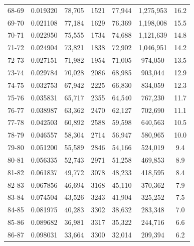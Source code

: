 \documentclass[10pt,a4paper]{article}
\begin{document}
\begin{longtable}{|c|c|c|c|c|c|c|}
68-69  & 0.019320      & 78,705       & 1521          & 77,944        & 1,275,953    & 16.2         \\
69-70  & 0.021108      & 77,184       & 1629          & 76,369        & 1,198,008    & 15.5         \\
70-71  & 0.022950      & 75,555       & 1734          & 74,688        & 1,121,639    & 14.8         \\
71-72  & 0.024904      & 73,821       & 1838          & 72,902        & 1,046,951    & 14.2         \\
72-73  & 0.027151      & 71,982       & 1954          & 71,005        & 974,050      & 13.5         \\
73-74  & 0.029784      & 70,028       & 2086          & 68,985        & 903,044      & 12.9         \\
74-75  & 0.032753      & 67,942       & 2225          & 66,830        & 834,059      & 12.3         \\
75-76  & 0.035831      & 65,717       & 2355          & 64,540        & 767,230      & 11.7         \\
76-77  & 0.038987      & 63,362       & 2470          & 62,127        & 702,690      & 11.1         \\
77-78  & 0.042503      & 60,892       & 2588          & 59,598        & 640,563      & 10.5         \\
78-79  & 0.046557      & 58,304       & 2714          & 56,947        & 580,965      & 10.0         \\
79-80  & 0.051200      & 55,589       & 2846          & 54,166        & 524,019      & 9.4          \\
80-81  & 0.056335      & 52,743       & 2971          & 51,258        & 469,853      & 8.9          \\
81-82  & 0.061837      & 49,772       & 3078          & 48,233        & 418,595      & 8.4          \\
82-83  & 0.067856      & 46,694       & 3168          & 45,110        & 370,362      & 7.9          \\
83-84  & 0.074504      & 43,526       & 3243          & 41,904        & 325,252      & 7.5          \\
84-85  & 0.081975      & 40,283       & 3302          & 38,632        & 283,348      & 7.0          \\
85-86  & 0.089682      & 36,981       & 3317          & 35,322        & 244,716      & 6.6          \\
86-87  & 0.098031      & 33,664       & 3300          & 32,014        & 209,394      & 6.2          \\

\end{longtable}
\end{document}
